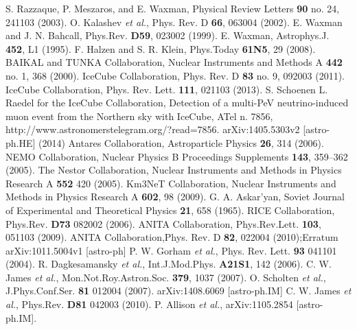 \begin{thebibliography}{1}
 S. Razzaque, P. Meszaros, and E. Waxman, Physical Review Letters \textbf{90} no. 24, 241103 (2003).
 O. Kalashev {\it et al.}, Phys. Rev. D \textbf{66}, 063004 (2002).
 E. Waxman and J. N. Bahcall, Phys.Rev. \textbf{D59},  023002 (1999).
  E. Waxman,  Astrophys.J. \textbf{452},  L1 (1995).
 F. Halzen and S. R. Klein, Phys.Today \textbf{61N5}, 29 (2008).
 BAIKAL and TUNKA Collaboration, Nuclear Instruments and Methods A \textbf{442} no. 1, 368 (2000).
 IceCube Collaboration, Phys. Rev. D \textbf{83} no. 9,  092003 (2011).
 IceCube Collaboration, Phys. Rev. Lett. \textbf{111}, 021103 (2013).
 S. Schoenen L. Raedel for the IceCube Collaboration, Detection of a multi-PeV neutrino-induced muon event from the Northern sky with IceCube, ATel n. 7856, http://www.astronomerstelegram.org/?read=7856.
 arXiv:1405.5303v2 [astro-ph.HE] (2014)
 Antares Collaboration, Astroparticle Physics \textbf{26}, 314 (2006).
 NEMO Collaboration, Nuclear Physics B Proceedings Supplements \textbf{143},  359–362 (2005).
  The Nestor Collaboration,  Nuclear Instruments and Methods in Physics Research A \textbf{552} 420 (2005).
  Km3NeT Collaboration, Nuclear Instruments and Methods in Physics Research A \textbf{602}, 98 (2009).
  G. A. Askar’yan, Soviet Journal of Experimental and Theoretical Physics \textbf{21}, 658 (1965).
 RICE Collaboration, Phys.Rev. \textbf{D73}  082002 (2006).
 ANITA Collaboration, Phys.Rev.Lett. \textbf{103},  051103 (2009).
ANITA Collaboration,Phys. Rev. D \textbf{82}, 022004 (2010);\newline Erratum arXiv:1011.5004v1 [astro-ph]
  P. W. Gorham {\it et al.},  Phys. Rev. Lett. \textbf{93}  041101 (2004).
 R. Dagkesamansky {\it et al.}, Int.J.Mod.Phys. \textbf{A21S1},  142 (2006).
 C. W. James {\it et al.}, Mon.Not.Roy.Astron.Soc. \textbf{379}, 1037 (2007).
  O. Scholten {\it et al.}, J.Phys.Conf.Ser. \textbf{81}  012004 (2007).
 arXiv:1408.6069 [astro-ph.IM]
  C. W. James {\it et al.}, Phys.Rev. \textbf{D81}  042003 (2010).
 P. Allison {\it et al.}, arXiv:1105.2854 [astro-ph.IM].

\end{thebibliography}
